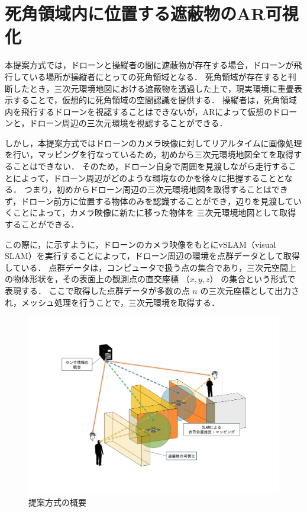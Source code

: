 \documentclass[a4paper,11pt]{ujreport}
\begin{document}
\section{死角領域内に位置する遮蔽物のAR可視化}
\label{sec:ARvisualize}
本提案方式では，ドローンと操縦者の間に遮蔽物が存在する場合，ドローンが飛行している場所が操縦者にとっての死角領域となる．
死角領域が存在すると判断したとき，三次元環境地図における遮蔽物を透過した上で，現実環境に重畳表示することで，仮想的に死角領域の空間認識を提供する．
操縦者は，死角領域内を飛行するドローンを視認することはできないが，ARによって仮想のドローンと，ドローン周辺の三次元環境を視認することができる．

しかし，本提案方式ではドローンのカメラ映像に対してリアルタイムに画像処理を行い，マッピングを行なっているため，初めから三次元環境地図全てを取得することはできない．
そのため，ドローン自身で周囲を見渡しながら走行することによって，ドローン周辺がどのような環境なのかを徐々に把握することとなる．
つまり，初めからドローン周辺の三次元環境地図を取得することはできず，ドローン前方に位置する物体のみを認識することができ，辺りを見渡していくことによって，カメラ映像に新たに移った物体を
三次元環境地図として取得することができる．

この際に，に示すように，ドローンのカメラ映像をもとにvSLAM（visual SLAM）を実行することによって，ドローン周辺の環境を点群データとして取得している．
点群データは，コンピュータで扱う点の集合であり，三次元空間上の物体形状を，その表面上の観測点の直交座標 $（x,y,z）$ の集合という形式で表現する．
ここで取得した点群データが多数の点 $n$ の三次元座標として出力され，メッシュ処理を行うことで，三次元環境を取得する．

\begin{figure}[!tb]
  \centering
  \includegraphics[width=\linewidth]{img/03_outline.pdf}
  \caption{提案方式の概要}
  \label{fig:03_outline}
\end{figure}
\end{document}
